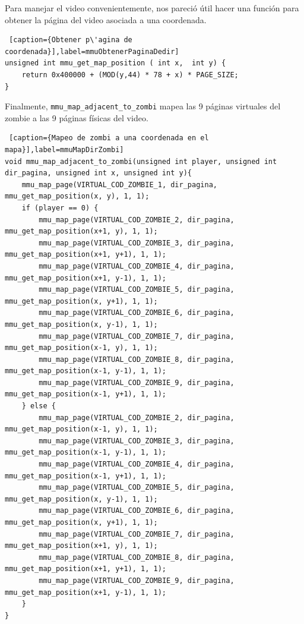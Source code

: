 \par Para manejar el video convenientemente, nos pareci\'o \'util hacer una funci\'on para obtener la p\'agina del video asociada a una coordenada.

\begin{lstlisting} [caption={Obtener p\'agina de coordenada}],label=mmuObtenerPaginaDedir] 
unsigned int mmu_get_map_position ( int x,  int y) {
	return 0x400000 + (MOD(y,44) * 78 + x) * PAGE_SIZE;
}
\end{lstlisting}

\newpage
\par Finalmente, \texttt{mmu_map_adjacent_to_zombi} mapea las 9 p\'aginas virtuales del zombie a las 9 p\'aginas f\'isicas del video.

\begin{lstlisting} [caption={Mapeo de zombi a una coordenada en el mapa}],label=mmuMapDirZombi] 
void mmu_map_adjacent_to_zombi(unsigned int player, unsigned int dir_pagina, unsigned int x, unsigned int y){
	mmu_map_page(VIRTUAL_COD_ZOMBIE_1, dir_pagina, mmu_get_map_position(x, y), 1, 1);
	if (player == 0) {
		mmu_map_page(VIRTUAL_COD_ZOMBIE_2, dir_pagina, mmu_get_map_position(x+1, y), 1, 1);
		mmu_map_page(VIRTUAL_COD_ZOMBIE_3, dir_pagina, mmu_get_map_position(x+1, y+1), 1, 1);
		mmu_map_page(VIRTUAL_COD_ZOMBIE_4, dir_pagina, mmu_get_map_position(x+1, y-1), 1, 1);
		mmu_map_page(VIRTUAL_COD_ZOMBIE_5, dir_pagina, mmu_get_map_position(x, y+1), 1, 1);
		mmu_map_page(VIRTUAL_COD_ZOMBIE_6, dir_pagina, mmu_get_map_position(x, y-1), 1, 1);
		mmu_map_page(VIRTUAL_COD_ZOMBIE_7, dir_pagina, mmu_get_map_position(x-1, y), 1, 1);
		mmu_map_page(VIRTUAL_COD_ZOMBIE_8, dir_pagina, mmu_get_map_position(x-1, y-1), 1, 1);
		mmu_map_page(VIRTUAL_COD_ZOMBIE_9, dir_pagina, mmu_get_map_position(x-1, y+1), 1, 1);
	} else {
		mmu_map_page(VIRTUAL_COD_ZOMBIE_2, dir_pagina, mmu_get_map_position(x-1, y), 1, 1);
		mmu_map_page(VIRTUAL_COD_ZOMBIE_3, dir_pagina, mmu_get_map_position(x-1, y-1), 1, 1);
		mmu_map_page(VIRTUAL_COD_ZOMBIE_4, dir_pagina, mmu_get_map_position(x-1, y+1), 1, 1);
		mmu_map_page(VIRTUAL_COD_ZOMBIE_5, dir_pagina, mmu_get_map_position(x, y-1), 1, 1);
		mmu_map_page(VIRTUAL_COD_ZOMBIE_6, dir_pagina, mmu_get_map_position(x, y+1), 1, 1);
		mmu_map_page(VIRTUAL_COD_ZOMBIE_7, dir_pagina, mmu_get_map_position(x+1, y), 1, 1);
		mmu_map_page(VIRTUAL_COD_ZOMBIE_8, dir_pagina, mmu_get_map_position(x+1, y+1), 1, 1);
		mmu_map_page(VIRTUAL_COD_ZOMBIE_9, dir_pagina, mmu_get_map_position(x+1, y-1), 1, 1);
	}
}
\end{lstlisting}